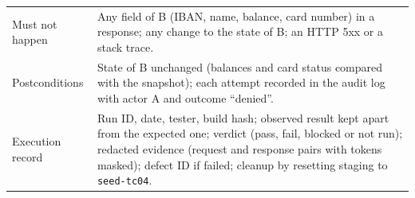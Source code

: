 \begin{table}[!h]
\begin{tabularx}{\textwidth}{@{}L{3.3cm}Y@{}}
Must not happen & Any field of B (IBAN, name, balance, card number) in a response; any change to the state of B; an HTTP 5xx or a stack trace. \\
Postconditions & State of B unchanged (balances and card status compared with the snapshot); each attempt recorded in the audit log with actor A and outcome ``denied''. \\
Execution record & Run ID, date, tester, build hash; observed result kept apart from the expected one; verdict (pass, fail, blocked or not run); redacted evidence (request and response pairs with tokens masked); defect ID if failed; cleanup by resetting staging to \texttt{seed-tc04}. \\
\bottomrule
\end{tabularx}
\end{table}
